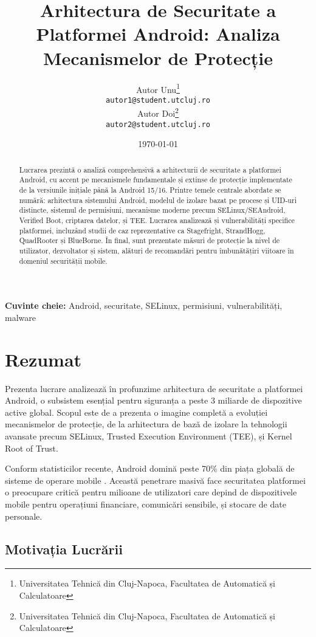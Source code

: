 \documentclass[11pt,a4paper,twocolumn]{article}
\title{Arhitectura de Securitate a Platformei Android: Analiza Mecanismelor de Protecție}
\author{%
    Autor Unu\footnote{Universitatea Tehnică din Cluj-Napoca, Facultatea de Automatică și Calculatoare}\\[0.1cm]
    \texttt{autor1@student.utcluj.ro}\\[0.3cm]
    Autor Doi\footnote{Universitatea Tehnică din Cluj-Napoca, Facultatea de Automatică și Calculatoare}\\[0.1cm]
    \texttt{autor2@student.utcluj.ro}%
}
\date{\today}
\theoremstyle{definition}
\theoremstyle{plain}
\theoremstyle{remark}
\begin{document}
\maketitle

\begin{abstract}
Lucrarea prezintă o analiză comprehensivă a arhitecturii de securitate a platformei Android, 
cu accent pe mecanismele fundamentale și extinse de protecție implementate de la versiunile 
inițiale până la Android 15/16. Printre temele centrale abordate se numără: arhitectura 
sistemului Android, modelul de izolare bazat pe procese și UID-uri distincte, sistemul de 
permisiuni, mecanisme moderne precum SELinux/SEAndroid, Verified Boot, criptarea datelor, 
și TEE. Lucrarea analizează și vulnerabilități specifice platformei, incluzând studii de 
caz reprezentative ca Stagefright, StrandHogg, QuadRooter și BlueBorne. În final, sunt 
prezentate măsuri de protecție la nivel de utilizator, dezvoltator și sistem, alături de 
recomandări pentru îmbunătățiri viitoare în domeniul securității mobile.
\end{abstract}

\textbf{Cuvinte cheie:} Android, securitate, SELinux, permisiuni, vulnerabilități, malware

\section{Rezumat}

Prezenta lucrare analizează în profunzime arhitectura de securitate a platformei Android, 
o subsistem esențial pentru siguranța a peste 3 miliarde de dispozitive active global. 
Scopul este de a prezenta o imagine completă a evoluției mecanismelor de protecție, de la 
arhitectura de bază de izolare la tehnologii avansate precum SELinux, Trusted Execution 
Environment (TEE), și Kernel Root of Trust.

Conform statisticilor recente, Android domină peste 70\% din piața globală de sisteme 
de operare mobile \cite{android_stats}. Această penetrare masivă face securitatea 
platformei o preocupare critică pentru milioane de utilizatori care depind de dispozitivele 
mobile pentru operațiuni financiare, comunicări sensibile, și stocare de date personale.

\subsection{Motivația Lucrării}
\end{document}
